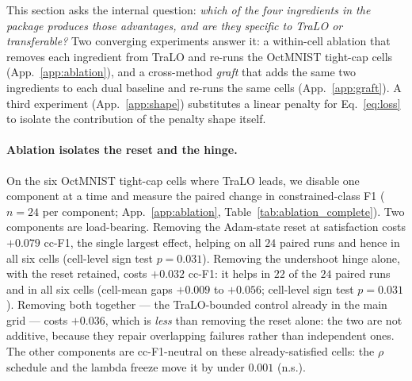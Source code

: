 \documentclass[10pt]{article}
\begin{document}
%
{This section asks the internal question:}
\emph{which of the four ingredients in the package produces those
advantages, and are they specific to TraLO or transferable?} Two
converging experiments answer it: a within-cell ablation that removes each
ingredient from TraLO and re-runs the OctMNIST tight-cap cells
(App.~\ref{app:ablation}), and a cross-method \emph{graft} that adds the
same two ingredients to each dual baseline and re-runs the same cells
(App.~\ref{app:graft}). A third experiment (App.~\ref{app:shape})
substitutes a linear penalty for Eq.~\eqref{eq:loss} to isolate the
contribution of the penalty shape itself.

\paragraph{Ablation isolates the reset and the hinge.}
On the six OctMNIST tight-cap cells where TraLO leads, we disable one
component at a time and measure the paired change in constrained-class F1
($n{=}24$ per component; {App.~\ref{app:ablation}, }Table~\ref{tab:ablation_complete}). Two
components are load-bearing. Removing the Adam-state reset at satisfaction
costs $+0.079$ cc-F1, the single largest effect, helping on all $24$
paired runs and hence in all six cells (cell-level sign test $p\!=\!0.031$).
{Removing the undershoot hinge alone, with the reset retained, costs
$+0.032$ cc-F1: it helps in $22$ of the $24$ paired runs and in all six cells
(cell-mean gaps $+0.009$ to $+0.056$; cell-level sign test $p\!=\!0.031$). Removing
both together --- the TraLO-bounded control already in the main grid --- costs
$+0.036$, which is \emph{less} than removing the reset alone: the two are not
additive, because they repair overlapping failures rather than independent ones.}
The other components are cc-F1-neutral on these already-satisfied cells: the
$\rho$ schedule and the lambda freeze move it by under $0.001$ (n.s.).
\end{document}
